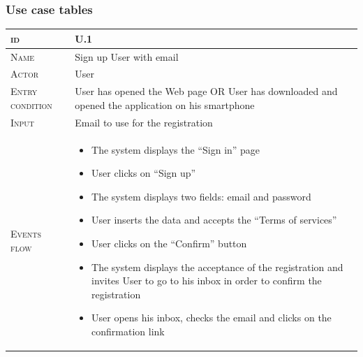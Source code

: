 \subsubsection*{Use case tables}
\begin{table}[H]
    \centering
    \begin{tabular}[c]{|l|p{}|}
        \hline %
    	\textsc{id}                 &   U.1\\
    	\hline %
    	\textsc{Name}               &   Sign up User with email\\
    	\hline %
    	\textsc{Actor}             &   User\\
    	\hline %
    	\textsc{Entry condition}   &   User has opened the Web page OR User has downloaded and opened the application on his smartphone\\
    	\hline %
    	\textsc{Input}   &   Email to use for the registration\\
    	\hline %
    	\textsc{Events flow}         &   %
            	                        \begin{itemize}
                                    	    \item The system displays the “Sign in” page
                                            \item User clicks on “Sign up”
                                            \item The system displays two fields: email and password
                                            \item User inserts the data and accepts the “Terms of services”
                                            \item User clicks on the “Confirm” button
                                            \item The system displays the acceptance of the registration and invites User to go to his inbox in order to confirm the registration
                                            \item User opens his inbox, checks the email and clicks on the confirmation link


\end{itemize}
\end{tabular}
\end{table}
